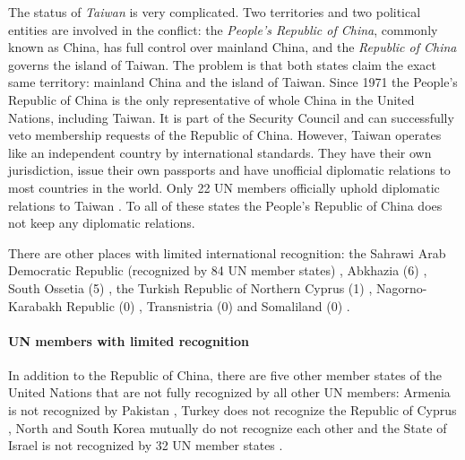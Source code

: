 The status of \emph{Taiwan} is very complicated. Two territories and two political entities are involved in the conflict: the \emph{People's Republic of China}, commonly known as China, has full control over mainland China, and the \emph{Republic of China} governs the island of Taiwan. The problem is that both states claim the exact same territory: mainland China and the island of Taiwan. Since 1971 the People's Republic of China is the only representative of whole China in the United Nations, including Taiwan. It is part of the Security Council and can successfully veto membership requests of the Republic of China. However, Taiwan operates like an independent country by international standards. They have their own jurisdiction, issue their own passports and have unofficial diplomatic relations to most countries in the world. Only 22 UN members officially uphold diplomatic relations to Taiwan \cite{TaiwanRecognition}. To all of these states the People's Republic of China does not keep any diplomatic relations.

There are other places with limited international recognition: the Sahrawi Arab Democratic Republic (recognized by 84 UN member states) \cite{WesternSaharaRecognition}, Abkhazia (6) \cite{AbkhaziaRecognition}, South Ossetia (5) \cite{SouthOssetiaRecognition}, the Turkish Republic of Northern Cyprus (1) \cite{NorthernCyprusRecognition}, Nagorno-Karabakh Republic (0) \cite{NagornoRecognition}, Transnistria (0) \cite{TransnistriaRecognition} and Somaliland (0) \cite{SomalilandRecognition}.


\paragraph{UN members with limited recognition} %
\label{par:un_members_with_limited_recognition}

In addition to the Republic of China, there are five other member states of the United Nations that are not fully recognized by all other UN members: Armenia is not recognized by Pakistan \cite{ArmeniaRecognition}, Turkey does not recognize the Republic of Cyprus \cite{CyprusRecognition}, North and South Korea mutually do not recognize each other \cite{KoreaRecognition} and the State of Israel is not recognized by 32 UN member states \cite{IsraelRecognition}.


